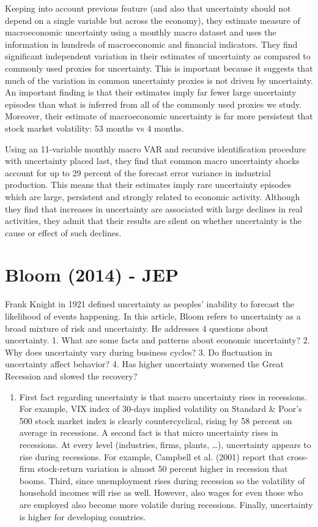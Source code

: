 \documentclass{article}
\begin{document}
{Keeping into account previous feature (and also that uncertainty should not depend on a single variable but across the economy), they estimate measure of macroeconomic uncertainty using a monthly macro dataset and uses the information in hundreds of macroeconomic and financial indicators. They find significant independent variation in their estimates of uncertainty as compared to commonly used proxies for uncertainty. This is important because it suggests that much of the variation in common uncertainty proxies is not driven by uncertainty. An important finding is that their estimates imply far fewer large uncertainty episodes than what is inferred from all of the commonly used proxies we study. Moreover, their estimate of macroeconomic uncertainty is far more persistent that stock market volatility: 53 months vs 4 months.

Using an 11-variable monthly macro VAR and recursive identification procedure with uncertainty placed last, they find that common macro uncertainty shocks account for up to 29 percent of the forecast error variance in industrial production. This means that their estimates imply rare uncertainty episodes which are large, persistent and strongly related to economic activity. Although they find that increases in uncertainty are associated with large declines in real activities, they admit that their results are silent on whether uncertainty is the cause or effect of such declines.



\section*{Bloom (2014) - JEP}

Frank Knight in 1921 defined uncertainty as peoples' inability to forecast the likelihood of events happening. In this article, Bloom refers to uncertainty as a broad mixture of risk and uncertainty. He addresses 4 questions about uncertainty. 1. What are some facts and patterns about economic uncertainty? 2. Why does uncertainty vary during business cycles? 3. Do fluctuation in uncertainty affect behavior? 4. Has higher uncertainty worsened the Great Recession and slowed the recovery?

\begin{enumerate}
	
	\item First fact regarding uncertainty is that macro uncertainty rises in recessions. For example, VIX index of 30-days implied volatility on Standard \& Poor's 500 stock market index is clearly countercyclical, rising by 58 percent on average in recessions. A second fact is that micro uncertainty rises in recessions. At every level (industries, firms, plants, \dots), uncertainty appears to rise during recessions. For example, Campbell et al. (2001) report that cross-firm stock-return variation is almost 50 percent higher in recession that booms. Third, since unemployment rises during recession so the volatility of household incomes will rise as well. However, also wages for even those who are employed also become more volatile during recessions. Finally, uncertainty is higher for developing countries.
	

\end{enumerate}}
\end{document}
